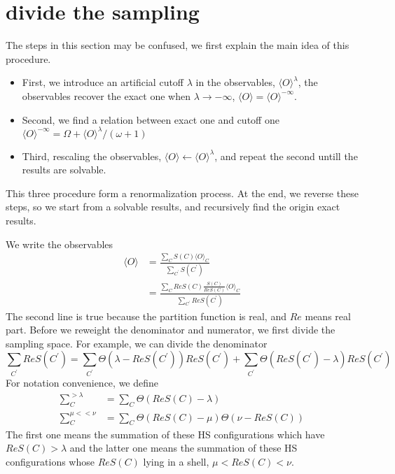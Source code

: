 \documentclass{article}
\begin{document}
    \section{divide the sampling}

    The steps in this section may be confused, we first explain the main idea of this procedure.
    \begin{itemize}
        \item First, we introduce an artificial cutoff $\lambda$ in the observables, $\langle O \rangle^{\lambda}$,
        the observables recover the exact one when $\lambda \rightarrow -\infty$, $\langle O \rangle = \langle O \rangle^{-\infty}$.
        \item Second, we find a relation between exact one and cutoff one $\langle O \rangle^{-\infty} = \Omega + \langle O \rangle^{\lambda} / (\omega+1)$
        \item Third, rescaling the observables, $\langle O \rangle \leftarrow \langle O \rangle^{\lambda} $, and repeat the second untill the results are solvable.
    \end{itemize}
    This three procedure form a renormalization process. At the end, we reverse these steps,
    so we start from a solvable results, and recursively find the origin exact results.    

    We write the observables
    \begin{equation}
        \begin{aligned}
            \langle O \rangle &= \frac{ \sum_{C} S(C) \langle O \rangle_{C} }{ \sum_{C^{\prime}} S(C^{\prime}) }\\
            &=\frac{ \sum_{C} ReS(C) \frac{S(C)}{ReS(C)} \langle O \rangle_{C} }{ \sum_{C^{\prime}} ReS(C^{\prime}) }
        \end{aligned}
    \end{equation}
    The second line is true because the partition function is real, and $Re$ means real part.
    Before we reweight the denominator and numerator, we first divide the sampling space.
    For example, we can divide the denominator
    \begin{equation}
        \sum_{C^{\prime}} ReS(C^{\prime}) = \sum_{C^{\prime}} \Theta(\lambda-ReS(C^{\prime})) ReS(C^{\prime}) +  \sum_{C^{\prime}} \Theta(ReS(C^{\prime})-\lambda) ReS(C^{\prime})
    \end{equation}
    For notation convenience, we define
    \begin{equation}
        \begin{aligned}
            \sum^{>\lambda}_{C} &= \sum_{C} \Theta(ReS(C)-\lambda)\\
            \sum^{\mu<<\nu}_{C} &=  \sum_{C} \Theta(ReS(C)-\mu) \Theta(\nu-ReS(C))
        \end{aligned}
    \end{equation}
    The first one means the summation of these HS configurations which have $ReS(C) > \lambda$
    and the latter one means the summation of these HS configurations whose $ReS(C)$ lying in a shell,
    $\mu< ReS(C) <\nu$.
\end{document}
